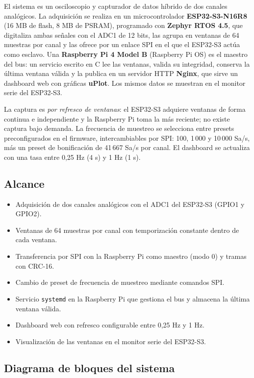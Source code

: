 \documentclass[12pt,a4paper]{article}
\begin{document}
El sistema es un osciloscopio y capturador de datos híbrido de dos canales analógicos. La adquisición se realiza en un microcontrolador \textbf{ESP32-S3-N16R8} (16 MB de flash, 8 MB de PSRAM), programado con \textbf{Zephyr RTOS 4.5}, que digitaliza ambas señales con el ADC1 de 12 bits, las agrupa en ventanas de 64 muestras por canal y las ofrece por un enlace SPI en el que el ESP32-S3 actúa como esclavo. Una \textbf{Raspberry Pi 4 Model B} (Raspberry Pi OS) es el maestro del bus: un servicio escrito en C lee las ventanas, valida su integridad, conserva la última ventana válida y la publica en un servidor HTTP \textbf{Nginx}, que sirve un dashboard web con gráficas \textbf{uPlot}. Los mismos datos se muestran en el monitor serie del ESP32-S3.

La captura es \emph{por refresco de ventanas}: el ESP32-S3 adquiere ventanas de forma continua e independiente y la Raspberry Pi toma la más reciente; no existe captura bajo demanda. La frecuencia de muestreo se selecciona entre presets preconfigurados en el firmware, intercambiables por SPI: 100, 1\,000 y 10\,000 Sa/s, más un preset de bonificación de 41\,667 Sa/s por canal. El dashboard se actualiza con una tasa entre 0{,}25 Hz (4 s) y 1 Hz (1 s).

\subsection{Alcance}

\begin{itemize}
  \item Adquisición de dos canales analógicos con el ADC1 del ESP32-S3 (GPIO1 y GPIO2).
  \item Ventanas de 64 muestras por canal con temporización constante dentro de cada ventana.
  \item Transferencia por SPI con la Raspberry Pi como maestro (modo 0) y tramas con CRC-16.
  \item Cambio de preset de frecuencia de muestreo mediante comandos SPI.
  \item Servicio \texttt{systemd} en la Raspberry Pi que gestiona el bus y almacena la última ventana válida.
  \item Dashboard web con refresco configurable entre 0{,}25 Hz y 1 Hz.
  \item Visualización de las ventanas en el monitor serie del ESP32-S3.
\end{itemize}

\subsection{Diagrama de bloques del sistema}
\end{document}
